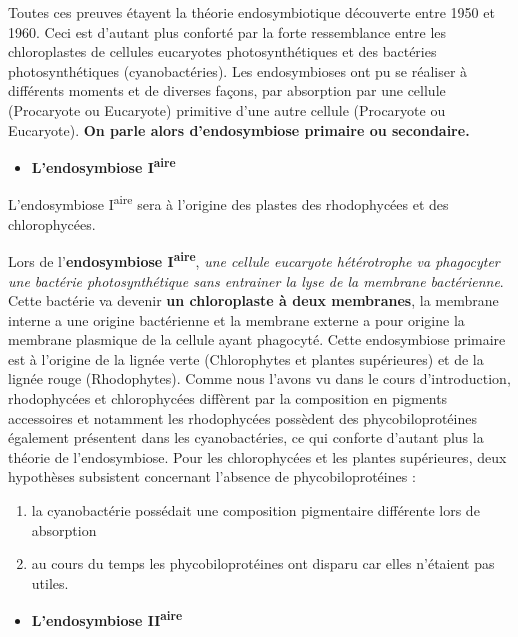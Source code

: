 \documentclass[
]{book}
\providecommand{\tightlist}{%
  \setlength{\itemsep}{0pt}\setlength{\parskip}{0pt}}
\begin{document}
Toutes ces preuves étayent la théorie endosymbiotique découverte entre 1950 et 1960. Ceci est d'autant plus conforté par la forte ressemblance entre les chloroplastes de cellules eucaryotes photosynthétiques et des bactéries photosynthétiques (cyanobactéries). Les endosymbioses ont pu se réaliser à différents moments et de diverses façons, par absorption par une cellule (Procaryote ou Eucaryote) primitive d'une autre cellule (Procaryote ou Eucaryote). \textbf{On parle alors d'endosymbiose primaire ou secondaire.}

\begin{itemize}
\tightlist
\item
  \textbf{L'endosymbiose I\textsuperscript{aire}}
\end{itemize}

L'endosymbiose I\textsuperscript{aire} sera à l'origine des plastes des rhodophycées et des chlorophycées.

Lors de l'\textbf{endosymbiose I\textsuperscript{aire}}, \emph{une cellule eucaryote hétérotrophe va phagocyter une bactérie photosynthétique sans entrainer la lyse de la membrane bactérienne}. Cette bactérie va devenir \textbf{un chloroplaste à deux membranes}, la membrane interne a une origine bactérienne et la membrane externe a pour origine la membrane plasmique de la cellule ayant phagocyté. Cette endosymbiose primaire est à l'origine de la lignée verte (Chlorophytes et plantes supérieures) et de la lignée rouge (Rhodophytes).
Comme nous l'avons vu dans le cours d'introduction, rhodophycées et chlorophycées diffèrent par la composition en pigments accessoires et notamment les rhodophycées possèdent des phycobiloprotéines également présentent dans les cyanobactéries, ce qui conforte d'autant plus la théorie de l'endosymbiose. Pour les chlorophycées et les plantes supérieures, deux hypothèses subsistent concernant l'absence de phycobiloprotéines :

\begin{enumerate}
\def\labelenumi{\arabic{enumi}.}
\tightlist
\item
  la cyanobactérie possédait une composition pigmentaire différente lors de absorption
\item
  au cours du temps les phycobiloprotéines ont disparu car elles n'étaient pas utiles.
\end{enumerate}

\begin{itemize}
\tightlist
\item
  \textbf{L'endosymbiose II\textsuperscript{aire}}
\end{itemize}
\end{document}
